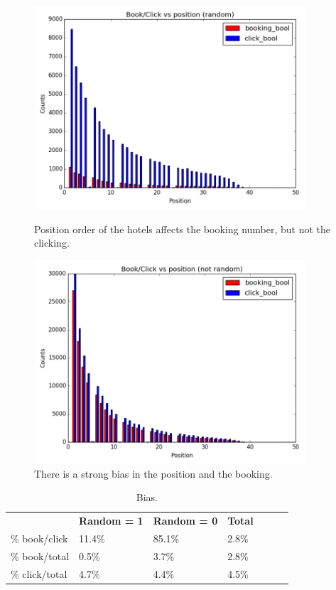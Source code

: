 \documentclass[9pt]{llncs}
\begin{document}
\begin{figure}[h]
     \centering
     \begin{minipage}{0.45\textwidth}
     \centering
     \includegraphics[width=0.9\textwidth]{hotel_position_vs_click_booking_random.png}
         \caption{Position order of the hotels affects the booking number, but not the clicking.}
         \label{mp_2a}
     \end{minipage}\hfill
     \begin{minipage}{0.45\textwidth}
         \centering
         \includegraphics[width=0.9\textwidth]{hotel_position_vs_click_booking_notrandom.png}
         \caption{There is a strong bias in the position and the booking.}
         \label{mp_2b}
     \end{minipage}
 \end{figure}
\begin{table}
\tiny
\centering
\caption{Bias.}
\begin{tabular}{lllllll}
\hline\noalign{\smallskip}
\textbf{} & \textbf{Random = 1} & \textbf{Random = 0}  & \textbf{Total} \\
\noalign{\smallskip}
\hline
\noalign{\smallskip}
\% book/click & 11.4\% & 85.1\% & 2.8\%\\
\% book/total & 0.5\% & 3.7\% & 2.8\%\\
\% click/total & 4.7\% & 4.4\% & 4.5\%\\
\hline
\end{tabular}
\label{table_bias}
\end{table}
\end{document}
